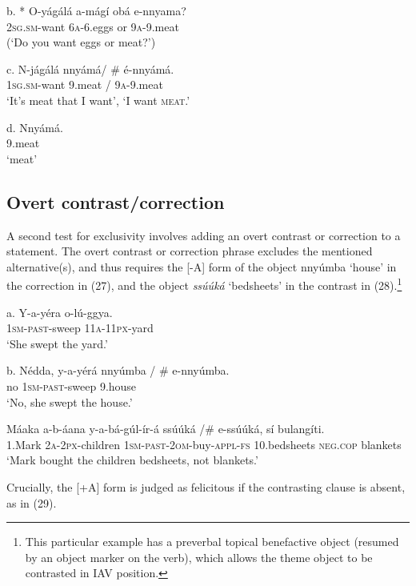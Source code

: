 \documentclass[output=paper]{langsci/langscibook}
\begin{document}
\ea
\gll   b.  * O-yágálá    a-mágí  obá  e-nnyama?\\
         \textsc{2sg}.\textsc{sm}-want    \textsc{6a}-6.eggs  or  \textsc{9a}-9.meat\\
\glt     (‘Do you want eggs or meat?’)
\z

\ea
\gll   c.  N-jágálá    nnyámá/ \# é-nnyámá.\\
         \textsc{1sg}.\textsc{sm}-want    9.meat / \textsc{9a}-9.meat\\
\glt     ‘It’s meat that I want’, ‘I want \textsc{meat}.’
\z

\ea
\gll   d.  Nnyámá.\\
         9.meat\\
\glt     ‘meat’
\z

\subsection{Overt contrast/correction} %

A second test for exclusivity involves adding an overt contrast or correction to a statement. The overt contrast or correction phrase excludes the mentioned alternative(s), and thus requires the [-A] form of the object nnyúmba ‘house’ in the correction in (27), and the object \textit{ssúúká} ‘bedsheets’ in the contrast in (28).\footnote{This particular example has a preverbal topical benefactive object (resumed by an object marker on the verb), which allows the theme object to be contrasted in IAV position.}

\ea
\gll   a.  Y-a-yéra    o-lú-ggya.\\
         \textsc{1sm}-\textsc{past}-sweep  \textsc{11a}-\textsc{11px}-yard\\
\glt     ‘She swept the yard.’
\z

\ea
\gll   b.  Nédda,  y-a-yérá    nnyúmba / \# e-nnyúmba.\\
         no    \textsc{1sm}-\textsc{past}-sweep  9.house\\
\glt     ‘No, she swept the house.’
\z

\ea
\gll   Máaka  a-b-áana    y-a-bá-gúl-ír-á        ssúúká /\# e-ssúúká,  sí    bulangíti.\\
       1.Mark  \textsc{2a}-\textsc{2px}-children  \textsc{1sm}-\textsc{past}-\textsc{2om}-buy-\textsc{appl}-\textsc{fs}  10.bedsheets     \textsc{neg}.\textsc{cop}  blankets\\
    ‘Mark bought the children bedsheets, not blankets.’
\z

Crucially, the [+A] form is judged as felicitous if the contrasting clause is absent, as in (29).
\end{document}
